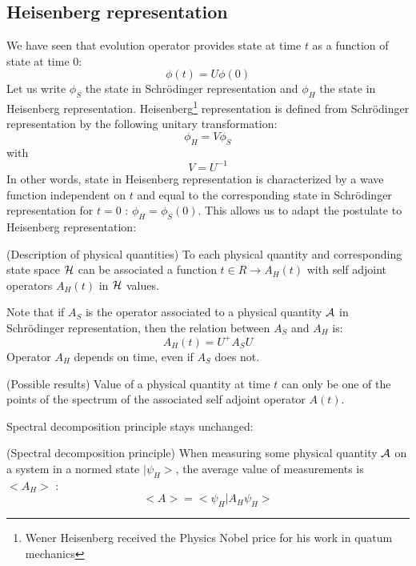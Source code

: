 \documentclass[12pt]{book}
\begin{document}
\subsection{Heisenberg representation}
We have seen that evolution operator provides state at time $t$ as a function
of state at time $0$:
\begin{equation}
\phi(t)=U\phi(0)
\end{equation}
Let us write $\phi_S$ the state in Schr\"odinger representation and
$\phi_H$ the state in Heisenberg representation.
Heisenberg\footnote{Wener Heisenberg received the Physics Nobel price
for his work in quatum mechanics}%
representation is defined from Schr\"odinger representation by the
following unitary transformation:
\begin{equation}
\phi_H=V\phi_S
\end{equation}
with
\begin{equation}
V=U^{-1}
\end{equation}
In other words, state in Heisenberg representation is characterized  by a wave
function independent on $t$ and equal to the corresponding state in
Schr\"odinger representation for 
$t=0$ : $\phi_H=\phi_S(0)$.
This allows us to adapt the postulate to Heisenberg representation:
\begin{postulat}(Description of physical quantities)
To each physical quantity and corresponding state space ${\cal H}$ can be
associated a function $t\in R\rightarrow A_H(t)$ with self adjoint operators
$A_H(t)$ in ${\cal H}$ values.
\end{postulat}
Note that if $A_S$ is the operator associated to a physical quantity
$\cal A$ in Schr\"odinger representation, then the relation between $A_S$
and $A_H$ is:
\begin{equation}
A_H(t)=U^+A_SU
\end{equation}
Operator $A_H$ depends on time, even if $A_S$ does not.
\begin{postulat}(Possible results)
Value of a physical quantity at time $t$ can only be one of the points of the
spectrum of the associated self adjoint operator $A(t)$.
\end{postulat}
Spectral decomposition principle stays unchanged:
\begin{postulat}(Spectral decomposition principle)
When measuring some physical quantity $\cal A$ on a system in a normed state
$|\psi_H \mathrel{>} $, the average value of measurements is $<A_H>$ :
\begin{equation}
<A>=<\psi_H|A_H\psi_H>
\end{equation}
\end{postulat}
\end{document}
